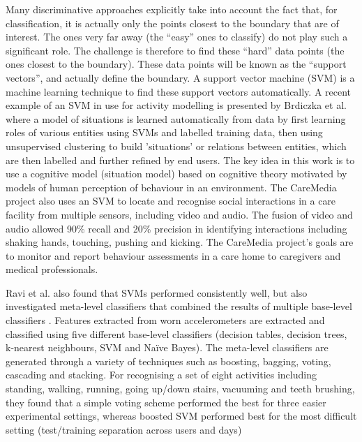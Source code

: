 Many discriminative approaches explicitly take into account the fact that, for classification, it is actually only the points closest to the boundary that are of interest. The ones very far away (the “easy” ones to classify) do not play such a significant role. The challenge is therefore to find these “hard” data points (the ones closest to the boundary). These data points will be known as the “support vectors”, and actually define the boundary. A support vector machine (SVM) is a machine learning technique to find these support vectors automatically. A recent example of an SVM in use for activity modelling is presented by Brdiczka et al. \cite{Brdiczka2009} where a model of situations is learned automatically from data by first learning roles of various entities using SVMs and labelled training data, then using unsupervised clustering to build ’situations’ or relations between entities, which are then labelled and further refined by end users. The key idea in this work is to use a cognitive model (situation model) based on cognitive theory motivated by models of human perception of behaviour in an environment. The CareMedia project \cite{Chen2005} also uses an SVM to locate and recognise social interactions in a care facility from multiple sensors, including video and audio. The fusion of video and audio allowed 90\% recall and 20\% precision in identifying interactions including shaking hands, touching, pushing and kicking. The CareMedia project’s goals are to monitor and report behaviour assessments in a care home to caregivers and medical professionals.

Ravi et al. also found that SVMs performed consistently well, but also investigated meta-level classifiers that combined the results of multiple base-level classifiers \cite{Ravi2005}. Features extracted from worn accelerometers are extracted and classified using five different base-level classifiers (decision tables, decision trees, k-nearest neighbours, SVM and Na\"ive Bayes). The meta-level classifiers are generated through a variety of techniques such as boosting, bagging, voting, cascading and stacking. For recognising a set of eight activities including standing, walking, running, going up/down stairs, vacuuming and teeth brushing, they found that a simple voting scheme performed the best for three easier experimental settings, whereas boosted SVM performed best for the most difficult setting (test/training separation across users and days)

